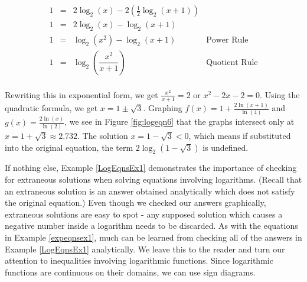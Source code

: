 {\begin{enumerate}
\[ \begin{array}{rclr}

1 & = & 2 \log_{2}(x) - 2 \left(\frac{1}{2} \log_{2}(x+1)\right) & \\ [2pt]
1 &= & 2\log_{2}(x) - \log_{2}(x+1) & \\ [2pt]
1 & = & \log_{2}\left(x^2\right) - \log_{2}(x+1) & \text{Power Rule} \\ [6pt]
1 & = & \log_{2}\left( \dfrac{x^{2}}{x+1}\right) & \text{Quotient Rule} \\ \end{array}\]

Rewriting this in exponential form, we get $ \frac{x^{2}}{x+1} = 2$ or $x^2 -2x-2 = 0$.  Using the quadratic formula, we get $x = 1 \pm \sqrt{3}$.  Graphing $f(x) = 1 + \frac{2\ln(x+1)}{\ln(4)}$ and $g(x) = \frac{2 \ln(x)}{\ln(2)}$, we see in Figure \ref{fig:logeqn6} that the graphs intersect only at $x = 1 + \sqrt{3} \approx 2.732$.  The solution $x = 1 - \sqrt{3} < 0$, which means if substituted into the original equation, the term $2 \log_{2}\left(1 - \sqrt{3}\right)$ is undefined.

{}

\end{enumerate}
}

\pagebreak

If nothing else,  Example \ref{LogEqnsEx1} demonstrates the importance of checking for extraneous solutions when solving equations involving logarithms.  (Recall that an extraneous solution is an answer obtained analytically which does not satisfy the original equation.) Even though we checked our answers graphically, extraneous solutions are easy to spot - any supposed solution which causes a negative number inside a logarithm needs to be discarded.  As with the equations in Example \ref{expeqnsex1}, much can be learned from checking all of the answers in Example \ref{LogEqnsEx1} analytically.  We leave this to the reader and turn our attention to inequalities involving logarithmic functions.  Since logarithmic functions are continuous on their domains, we can use sign diagrams.  

\medskip

